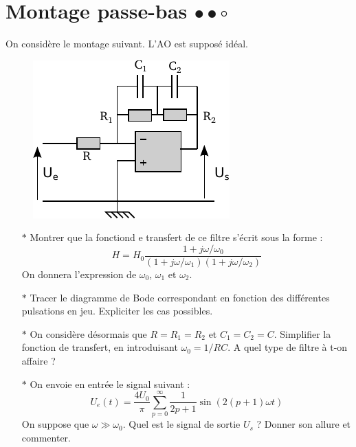 \documentclass{report}
\begin{document}
\newpage

\section*{Montage passe-bas $\bullet\bullet\circ$}

On considère le montage suivant. L'AO est supposé idéal.

\begin{figure}[!h]
\centering
\includegraphics[width=0.5\linewidth]{circuit_6.pdf}
\end{figure}

\begin{itemize}

	\item[$\ast$] Montrer que la fonctiond e transfert de ce filtre s'écrit sous la forme :
\begin{equation}
	H=H_0\frac{1+j\omega/\omega_0}{(1+j\omega/\omega_1)(1+j\omega/\omega_2)}
\end{equation}
On donnera l'expression de $\omega_0$, $\omega_1$ et $\omega_2$.

\item[$\ast$] Tracer le diagramme de Bode correspondant en fonction des différentes pulsations en jeu. Expliciter les cas possibles.

\item[$\ast$] On considère désormais que $R=R_1=R_2$ et $C_1=C_2=C$. Simplifier la fonction de transfert, en introduisant $\omega_0=1/RC$. A quel type de filtre à t-on affaire ?

\item[$\ast$] On envoie en entrée le signal suivant :
\begin{equation}
	U_e(t) = \frac{4U_0}{\pi}\sum_{p=0}^{\infty}\frac{1}{2p+1}\sin(2(p+1)\omega t)
\end{equation}
On suppose que $\omega\gg\omega_0$. Quel est le signal de sortie $U_s$ ? Donner son allure et commenter. 

\end{itemize}
\end{document}
